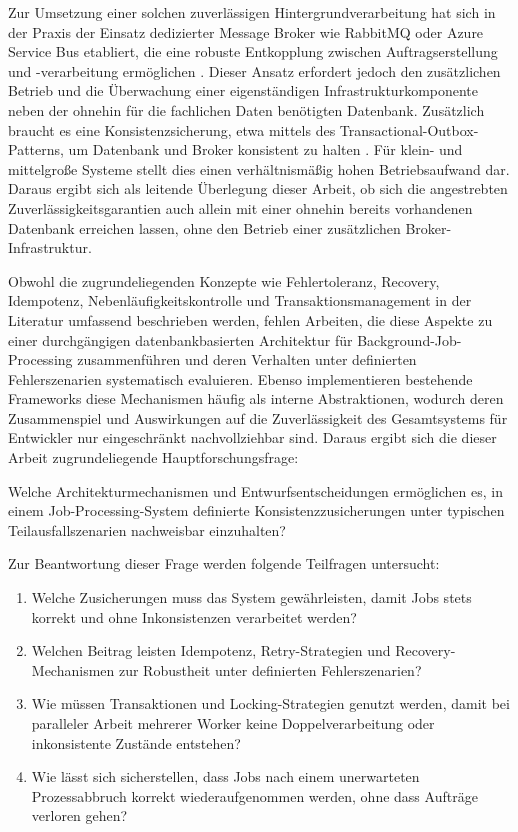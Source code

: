 Zur Umsetzung einer solchen zuverlässigen Hintergrundverarbeitung hat sich in der Praxis der Einsatz dedizierter Message
Broker wie RabbitMQ oder Azure Service Bus etabliert, die eine robuste Entkopplung zwischen Auftragserstellung und -verarbeitung
ermöglichen \parencite[Kap.~11]{kleppmann_designing_2017}.
Dieser Ansatz erfordert jedoch den zusätzlichen Betrieb und die Überwachung einer eigenständigen Infrastrukturkomponente
neben der ohnehin für die fachlichen Daten benötigten Datenbank.
Zusätzlich braucht es eine Konsistenzsicherung, etwa mittels des Transactional-Outbox-Patterns, um Datenbank und Broker
konsistent zu halten \parencite[Kap.~8 Abschnitt \glqq Pattern: Transactional Outbox\grqq]{newman_building_2026}.
Für klein- und mittelgroße Systeme stellt dies einen verhältnismäßig hohen Betriebsaufwand dar.
Daraus ergibt sich als leitende Überlegung dieser Arbeit, ob sich die angestrebten Zuverlässigkeitsgarantien auch allein
mit einer ohnehin bereits vorhandenen Datenbank erreichen lassen, ohne den Betrieb einer zusätzlichen Broker-Infrastruktur.

Obwohl die zugrundeliegenden Konzepte wie Fehlertoleranz, Recovery, Idempotenz, Nebenläufigkeitskontrolle und Transaktionsmanagement
in der Literatur umfassend beschrieben werden, fehlen Arbeiten, die diese Aspekte zu einer durchgängigen datenbankbasierten
Architektur für Background-Job-Processing zusammenführen und deren Verhalten unter definierten Fehlerszenarien systematisch evaluieren.
Ebenso implementieren bestehende Frameworks diese Mechanismen häufig als interne Abstraktionen, wodurch deren Zusammenspiel und Auswirkungen
auf die Zuverlässigkeit des Gesamtsystems für Entwickler nur eingeschränkt nachvollziehbar sind.
Daraus ergibt sich die dieser Arbeit zugrundeliegende Hauptforschungsfrage:

Welche Architekturmechanismen und Entwurfsentscheidungen ermöglichen es, in einem Job-Processing-System
definierte Konsistenzzusicherungen unter typischen Teilausfallszenarien nachweisbar einzuhalten?

Zur Beantwortung dieser Frage werden folgende Teilfragen untersucht:
\begin{enumerate}[label=TF-\arabic*:, ref=TF-\arabic*]
    \item \label{item:tf1} Welche Zusicherungen muss das System gewährleisten, damit Jobs stets
    korrekt und ohne Inkonsistenzen verarbeitet werden?
    \item \label{item:tf2} Welchen Beitrag leisten Idempotenz, Retry-Strategien und Recovery-Mechanismen
    zur Robustheit unter definierten Fehlerszenarien?
    \item \label{item:tf3} Wie müssen Transaktionen und Locking-Strategien genutzt werden, damit
    bei paralleler Arbeit mehrerer Worker keine Doppelverarbeitung oder inkonsistente Zustände entstehen?
    \item \label{item:tf4} Wie lässt sich sicherstellen, dass Jobs nach einem unerwarteten Prozessabbruch korrekt
    wiederaufgenommen werden, ohne dass Aufträge verloren gehen?
\end{enumerate}

